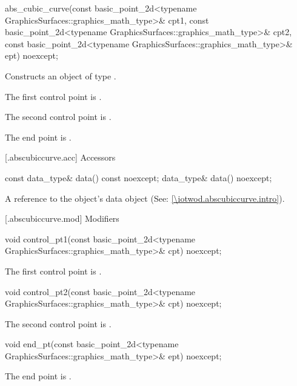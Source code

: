 %
\begin{itemdecl}
abs_cubic_curve(const basic_point_2d<typename GraphicsSurfaces::graphics_math_type>& cpt1,
  const basic_point_2d<typename GraphicsSurfaces::graphics_math_type>& cpt2,
  const basic_point_2d<typename GraphicsSurfaces::graphics_math_type>& ept) noexcept;
\end{itemdecl}
\begin{itemdescr}
\pnum
\effects Constructs an object of type .

\pnum
\remarks The first control point is .

\pnum
\remarks The second control point is .

\pnum
\remarks The end point is .
\end{itemdescr}

 [\iotwod.abscubiccurve.acc] {Accessors}%

%
\begin{itemdecl}
const data_type& data() const noexcept;
data_type& data() noexcept;
\end{itemdecl}
\begin{itemdescr}
\pnum
\returns A reference to the  object's data object (See: \ref{\iotwod.abscubiccurve.intro}).
\end{itemdescr}

 [\iotwod.abscubiccurve.mod] {Modifiers}

%
\begin{itemdecl}
void control_pt1(const basic_point_2d<typename
  GraphicsSurfaces::graphics_math_type>& cpt) noexcept;
\end{itemdecl}
\begin{itemdescr}
\pnum
\effects
The first control point is .
\end{itemdescr}

%
\begin{itemdecl}
void control_pt2(const basic_point_2d<typename
  GraphicsSurfaces::graphics_math_type>& cpt) noexcept;
\end{itemdecl}
\begin{itemdescr}
\pnum
\effects
The second control point is .
\end{itemdescr}

%
\begin{itemdecl}
void end_pt(const basic_point_2d<typename GraphicsSurfaces::graphics_math_type>& ept) noexcept;
\end{itemdecl}
\begin{itemdescr}
\pnum
\effects
The end point is .
\end{itemdescr}

